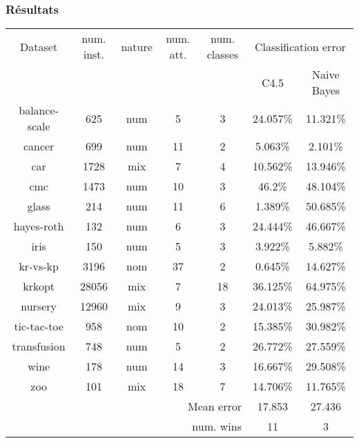 \begin{frame}
 \frametitle{Résultats}
\begin{center}
\begin{small}
 
\begin{agrandirmarges}{1cm}{2cm}
 
 
\begin{tabular}{|c|c|c|c|c|c|c|}
\hline
Dataset & num. inst. & nature & num. att. & num. classes & \multicolumn{2}{c|}{ Classification error } \\
\cline{6-7}
& & & & & C4.5 & Naive Bayes \\
\hline
balance-scale&625&num&5&3&24.057\%&11.321\% \\
\hline
cancer&699&num&11&2&5.063\%&2.101\% \\
\hline
car&1728&mix&7&4&10.562\%&13.946\% \\
\hline
cmc&1473&num&10&3&46.2\%&48.104\% \\
\hline
glass&214&num&11&6&1.389\%&50.685\% \\
\hline
hayes-roth&132&num&6&3&24.444\%&46.667\% \\
\hline
iris&150&num&5&3&3.922\%&5.882\% \\
\hline
kr-vs-kp&3196&nom&37&2&0.645\%&14.627\% \\
\hline
krkopt&28056&mix&7&18&36.125\%&64.975\% \\
\hline
nursery&12960&mix&9&3&24.013\%&25.987\% \\
\hline
tic-tac-toe&958&nom&10&2&15.385\%&30.982\% \\
\hline
transfusion&748&num&5&2&26.772\%&27.559\% \\
\hline
wine&178&num&14&3&16.667\%&29.508\% \\
\hline
zoo&101&mix&18&7&14.706\%&11.765\% \\
\hline
\multicolumn{5}{|r|}{ Mean error } & 17.853 & 27.436\\
\hline
\multicolumn{5}{|r|}{ num. wins } & 11 & 3\\
\hline
\end{tabular}

\end{agrandirmarges}
\end{small}

\end{center}

\end{frame}
 